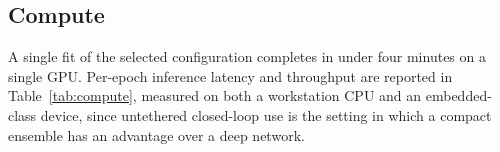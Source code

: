 \subsection{Compute}
\label{subsec:compute}

A single fit of the selected configuration completes in under four
minutes on
a single GPU. Per-epoch inference latency and throughput are reported in
Table~\ref{tab:compute}, measured on
both a workstation CPU and an embedded-class device, since untethered
closed-loop use is the setting in which a compact ensemble has an
advantage over a deep network.


%


